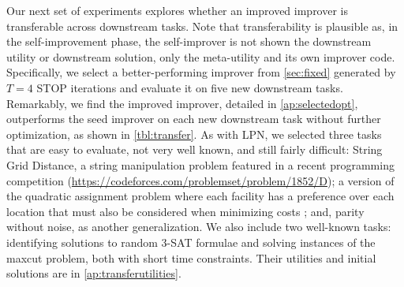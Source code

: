 \documentclass{article}
\begin{document}
Our next set of experiments explores whether an improved improver is transferable across downstream tasks.
Note that transferability is plausible as, in the self-improvement phase, the self-improver is not shown the downstream utility or downstream solution, only the meta-utility and its own improver code.
Specifically, we select a better-performing improver from \cref{sec:fixed} generated by $T=4$ STOP iterations and evaluate it on five new downstream tasks. 
Remarkably, we find the improved improver, detailed in \cref{ap:selectedopt}, outperforms the seed improver on each new downstream task without further optimization, as shown in \cref{tbl:transfer}.
As with LPN, we selected three tasks that are easy to evaluate, not very well known, and still fairly difficult: String Grid Distance, a string manipulation problem featured in a recent programming competition (\url{https://codeforces.com/problemset/problem/1852/D}); a version of the quadratic assignment problem where each facility has a preference over each location that must also be considered when minimizing costs \citep{koopmans1957assignment}; and, parity without noise, as another generalization. We also include two well-known tasks: identifying solutions to random 3-SAT formulae and solving instances of the maxcut problem, both with short time constraints. Their utilities and initial solutions are in \cref{ap:transferutilities}.
\end{document}
